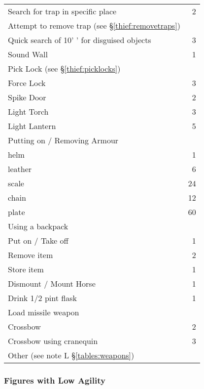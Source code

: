 \begin{multicols*}{3}
\begin{tabularx}{\linewidth}{Xr}
Search for trap in specific place	& 2 \\
Attempt to remove trap (see \S\ref{thief:removetraps})	&  \\
Quick search of 10' \x 10' for disguised objects & 3 \\
Sound Wall				& 1 \\
Pick Lock (see \S\ref{thief:picklocks})	&  \\
Force Lock				& 3 \\
Spike Door				& 2 \\
Light Torch				& 3 \\
Light Lantern				& 5 \\
Putting on / Removing Armour		& \\
\hspace{1em}helm			& 1 \\
\hspace{1em}leather			& 6 \\
\hspace{1em}scale			& 24 \\
\hspace{1em}chain			& 12 \\
\hspace{1em}plate			& 60 \\
Using a backpack			& \\
\hspace{1em}Put on / Take off 		& 1 \\
\hspace{1em}Remove item			& 2 \\
\hspace{1em}Store item			& 1 \\
Dismount / Mount Horse			& 1 \\
Drink 1/2 pint flask			& 1 \\
Load missile weapon			& \\
\hspace{1em}Crossbow			& 2 \\
\hspace{1em}Crossbow using cranequin	& 3 \\
\hspace{1em}Other (see note L \S\ref{tables:weapons}) &  \\
\end{tabularx}

\subsubsection{Figures with Low Agility}


\end{multicols*}
